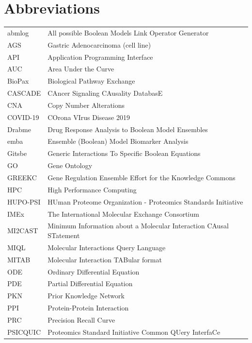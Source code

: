 \documentclass[
  12pt,
]{book}
\begin{document}
\hypertarget{abbreviations}{%
\chapter*{Abbreviations}\label{abbreviations}}

\begin{longtable}{ll}
\toprule
abmlog & All possible Boolean Models Link Operator Generator\\
AGS & Gastric Adenocarcinoma (cell line)\\
API & Application Programming Interface\\
AUC & Area Under the Curve\\
BioPax & Biological Pathway Exchange\\
\addlinespace
CASCADE & CAncer Signaling CAusality DatabasE\\
CNA & Copy Number Alterations\\
COVID-19 & COrona VIrus Disease 2019\\
Drabme & Drug Response Analysis to Boolean Model Ensembles\\
emba & Ensemble (Boolean) Model Biomarker Analysis\\
\addlinespace
Gitsbe & Generic Interactions To Specific Boolean Equations\\
GO & Gene Ontology\\
GREEKC & Gene Regulation Ensemble Effort for the Knowledge Commons\\
HPC & High Performance Computing\\
HUPO-PSI & HUman Proteome Organization - Proteomics Standards Initiative\\
\addlinespace
IMEx & The International Molecular Exchange Consortium\\
MI2CAST & Minimum Information about a Molecular Interaction CAusal STatement\\
MIQL & Molecular Interactions Query Language\\
MITAB & Molecular Interaction TABular format\\
ODE & Ordinary Differential Equation\\
\addlinespace
PDE & Partial Differential Equation\\
PKN & Prior Knowledge Network\\
PPI & Protein-Protein Interaction\\
PRC & Precision Recall Curve\\
PSICQUIC & Proteomics Standard Initiative Common QUery InterfaCe\\

\end{longtable}
\end{document}
